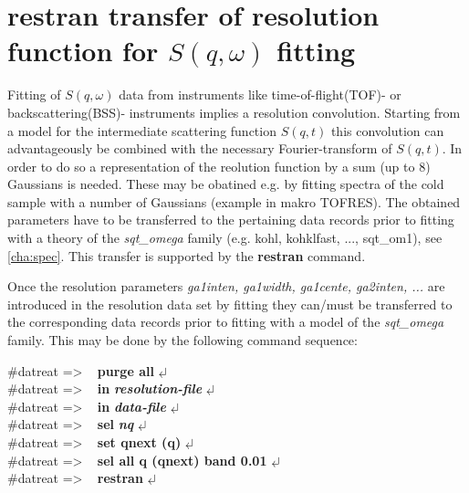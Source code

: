 \documentclass[11pt,fleqn]{book} %
\newcommand{\return}{$\carriagereturn$} %
\newcommand{\sysprompt}{{\color{green}...\textgreater} ~ }
\newcommand{\dtrprompt}{{\color{blue}\#datreat =\textgreater} ~ }
\newcommand{\enter}[1]{{\color{red} \bf #1}}
\newcommand{\var}[1]{{\color{red} \bf \it #1}}
\newcommand{\desc}[1]{\hskip 0.5cm {\color{descgray} #1}}
\begin{document}


\section{restran \desc{transfer of resolution function for $S(q,\omega)$ fitting}} 


\begin{exercise}
Fitting of $S(q,\omega)$ data from instruments like time-of-flight(TOF)- or backscattering(BSS)-
instruments implies a resolution convolution. Starting from a model for the intermediate
scattering function $S(q,t)$ this convolution can advantageously be combined with the necessary
Fourier-transform of $S(q,t)$. In order to do so a representation of the reolution function by
a sum (up to 8) Gaussians is needed. These may be obatined e.g. by fitting spectra of the cold
sample with a number of Gaussians (example in makro TOFRES).
The obtained parameters have to be transferred to the pertaining data records prior to fitting 
with a theory of the \textit{sqt\_omega} family (e.g. kohl, kohklfast, ..., sqt\_om1),
see \ref{cha:spec}.
This transfer is supported by the \textbf{restran} command.
\end{exercise}

Once the resolution parameters \textit{ga1inten, ga1width, ga1cente, ga2inten, ...} are 
introduced in the resolution data set by fitting they can/must be transferred to the
corresponding data records prior to fitting with a model of the \textit{sqt\_omega} family.
This may be done by the following command sequence:
\begin{corollary}
\dtrprompt {\bf purge all} \return  \\
\dtrprompt {\bf in} \var{resolution-file} \return  \\
\dtrprompt {\bf in} \var{data-file}  \return  \\
\dtrprompt {\bf sel} \var{nq} \return  \\
\dtrprompt {\bf set qnext (q)} \return  \\
\dtrprompt {\bf sel all q (qnext) band 0.01} \return  \\
\dtrprompt {\bf restran}  \return  \\
\end{corollary}
\end{document}
